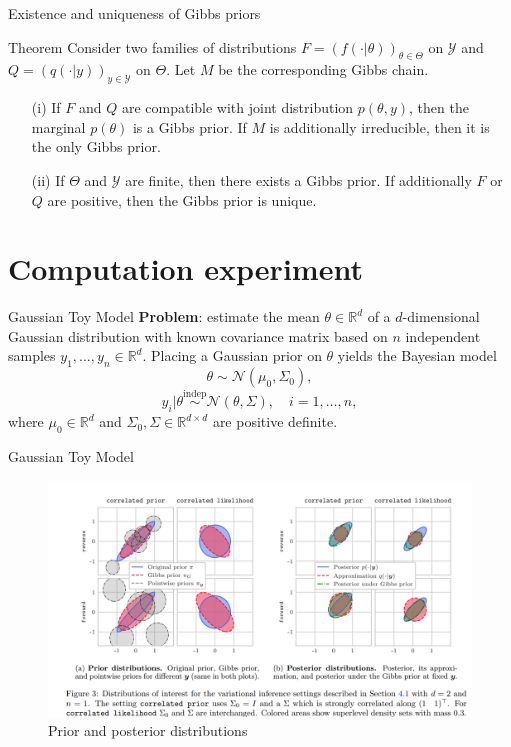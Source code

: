 \documentclass{beamer}
\begin{document}
	\begin{frame}{Existence and uniqueness of Gibbs priors}
		\begin{block}{Theorem}
			Consider two families of distributions \( F = (f(\cdot|\theta))_{\theta \in \Theta} \) on \( \mathcal{Y} \) and \( Q = (q(\cdot|y))_{y \in \mathcal{Y}} \) on \( \Theta \). Let \( M \) be the corresponding Gibbs chain.
			
			\begin{itemize}
				\item[(i)] If \( F \) and \( Q \) are compatible with joint distribution \( p(\theta, y) \), then the marginal \( p(\theta) \) is a Gibbs prior. If \( M \) is additionally irreducible, then it is the only Gibbs prior.
				\item[(ii)] If \( \Theta \) and \( \mathcal{Y} \) are finite, then there exists a Gibbs prior. If additionally \( F \) or \( Q \) are positive, then the Gibbs prior is unique.
			\end{itemize}
		\end{block}
	\end{frame}
	
	\section{Computation experiment}
	
	\begin{frame}{Gaussian Toy Model}
		\textbf{Problem}: estimate the mean \( \theta \in \mathbb{R}^d \) of a \( d \)-dimensional Gaussian distribution with known covariance matrix based on \( n \) independent samples \( y_1, \ldots, y_n \in \mathbb{R}^d \). Placing a Gaussian prior on \( \theta \) yields the Bayesian model
		\[
		\theta \sim \mathcal{N}(\mu_0, \Sigma_0),
		\]
		\[
		y_i|\theta \overset{\text{indep}}{\sim} \mathcal{N}(\theta, \Sigma), \quad i = 1, \ldots, n,
		\]
		where \( \mu_0 \in \mathbb{R}^d \) and \( \Sigma_0, \Sigma \in \mathbb{R}^{d \times d} \) are positive definite.
	\end{frame}


	\begin{frame}{Gaussian Toy Model}
		\begin{figure}[bhtp]
			\includegraphics[width=\linewidth]{gaussian-toy-example.png}
			\caption{Prior and posterior distributions}
		\end{figure}
	\end{frame}
\end{document}
